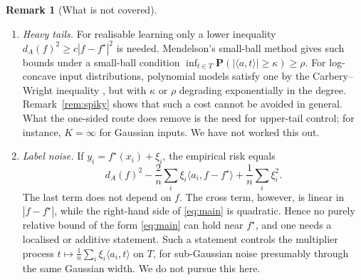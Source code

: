 \documentclass[11pt]{article}
\theoremstyle{definition}
\newtheorem{remark}[theorem]{Remark}
\numberwithin{equation}{section}
\newcommand{\Prob}{\mathbf{P}}
\newcommand{\fs}{f^{\star}}
\begin{document}
\begin{remark}[What is not covered]\label{rem:notcovered}
\begin{enumerate}
\item[(a)] \emph{Heavy tails.} For realisable learning only a lower inequality $d_A(f)^2\ge c|f-\fs|^2$ is needed. Mendelson's small-ball method \cite{Mendelson} gives such bounds under a small-ball condition $\inf_{t\in T}\Prob(|\langle a,t\rangle|\ge\kappa)\ge\rho$. For log-concave input distributions, polynomial models satisfy one by the Carbery--Wright inequality \cite{CarberyWright}, but with $\kappa$ or $\rho$ degrading exponentially in the degree. Remark~\ref{rem:spiky} shows that such a cost cannot be avoided in general. What the one-sided route does remove is the need for upper-tail control; for instance, $K=\infty$ for Gaussian inputs. We have not worked this out.
\item[(b)] \emph{Label noise.} If $y_i=\fs(x_i)+\xi_i$, the empirical risk equals
\[
d_A(f)^2-\frac2n\sum_i\xi_i\langle a_i,f-\fs\rangle+\frac1n\sum_i\xi_i^2 .
\]
The last term does not depend on $f$. The cross term, however, is linear in $|f-\fs|$, while the right-hand side of \eqref{eq:main} is quadratic. Hence no purely relative bound of the form \eqref{eq:main} can hold near $\fs$, and one needs a localised or additive statement. Such a statement controls the multiplier process $t\mapsto\frac1n\sum_i\xi_i\langle a_i,t\rangle$ on $T$, for sub-Gaussian noise presumably through the same Gaussian width. We do not pursue this here.
\end{enumerate}
\end{remark}
\end{document}
